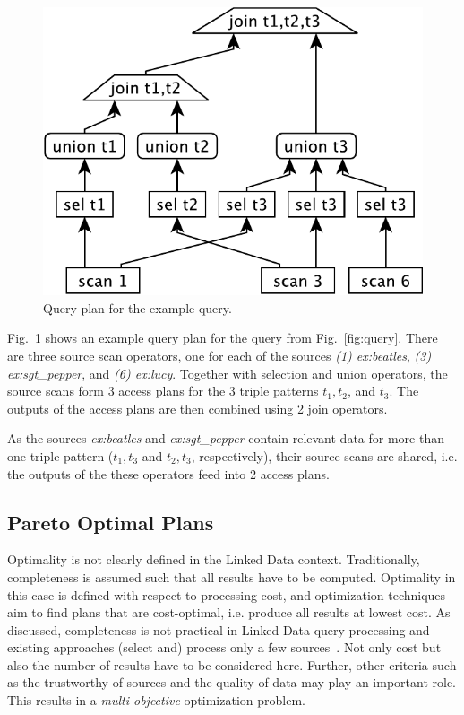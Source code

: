\begin{figure}[htb]
  \centering
  \includegraphics[width=0.6\linewidth]{figs/plan-crop.pdf}
  \caption{Query plan for the example query.}
\label{fig:plan}
\vspace{-0.5cm}
\end{figure}
\begin{example}
  Fig.~\ref{fig:plan} shows an example query plan for the query from
  Fig.~\ref{fig:query}. There are three source scan operators, one for
  each of the sources \emph{(1) ex:beatles}, \emph{(3)
    ex:sgt\_pepper}, and \emph{(6) ex:lucy}. Together with selection
  and union operators, the source scans form 3 access plans for the 3
  triple patterns $t_1, t_2$, and $t_3$.  The outputs of the access
  plans are then combined using 2 join operators.

  As the sources \emph{ex:beatles} and \emph{ex:sgt\_pepper} contain
  relevant data for more than one triple pattern ($t_1,t_3$ and
  $t_2,t_3$, respectively), their source scans are shared, i.e. the
  outputs of the these operators feed into 2 access plans.
\end{example}


\subsection{Pareto Optimal Plans} 
Optimality is not clearly defined in the Linked Data context. Traditionally, completeness is assumed such that all results have to be computed. Optimality in this case is defined with respect to processing cost, and optimization techniques aim to find plans that are cost-optimal, i.e. produce all results at lowest cost. As discussed, completeness is not practical in Linked Data query processing and existing approaches (select and) process only a few sources~\cite{harth_data_2010,ladwig_linked_2010}. Not only cost but also the number of results have to be considered here. Further, other criteria such as the trustworthy of sources and the quality of data may play an important role. This results in a \emph{multi-objective} optimization problem. 

